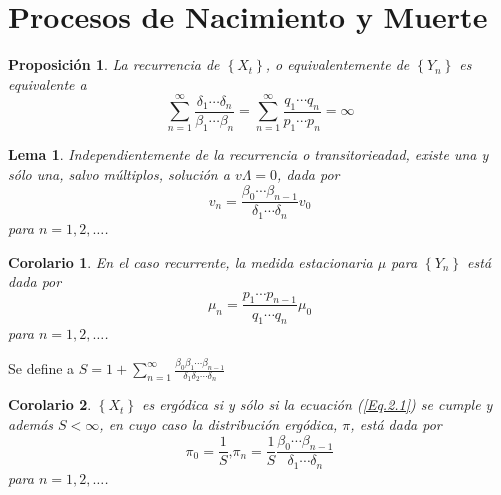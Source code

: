 \documentclass{article}
\newtheorem{Prop}{Proposición}[section]
\newtheorem{Cor}{Corolario}[section]
\newtheorem{Lema}{Lema}[section]
\numberwithin{equation}{section}
\begin{document}
%
\section{Procesos de Nacimiento y Muerte}
%

\begin{Prop}\label{Prop.2.1}
La recurrencia de $\left\{X_{t}\right\}$, o equivalentemente de
$\left\{Y_{n}\right\}$ es equivalente a
\begin{equation}\label{Eq.2.1}
\sum_{n=1}^{\infty}\frac{\delta_{1}\cdots\delta_{n}}{\beta_{1}\cdots\beta_{n}}=\sum_{n=1}^{\infty}\frac{q_{1}\cdots
q_{n}}{p_{1}\cdots p_{n}}=\infty
\end{equation}
\end{Prop}

\begin{Lema}\label{Lema.2.2}
Independientemente de la recurrencia o transitorieadad, existe una
y s\'olo una, salvo m\'ultiplos, soluci\'on a $v\Lambda=0$, dada por
\begin{equation}\label{Eq.2.2}
v_{n}=\frac{\beta_{0}\cdots\beta_{n-1}}{\delta_{1}\cdots\delta_{n}}v_{0}
\end{equation}
para $n=1,2,\ldots$.
\end{Lema}

\begin{Cor}\label{Cor.2.3}
En el caso recurrente, la medida estacionaria $\mu$ para
$\left\{Y_{n}\right\}$ est\'a dada por
\begin{equation}
\mu_{n}=\frac{p_{1}\cdots p_{n-1}}{q_{1}\cdots q_{n}}\mu_{0}
\end{equation}
para $n=1,2,\ldots$.
\end{Cor}

Se define a
$S=1+\sum_{n=1}^{\infty}\frac{\beta_{0}\beta_{1}\cdots\beta_{n-1}}{\delta_{1}\delta_{2}\cdots\delta_{n}}$

\begin{Cor}\label{Cor.2.4}
$\left\{X_{t}\right\}$ es erg\'odica si y s\'olo si la ecuaci\'on
(\ref{Eq.2.1}) se cumple y adem\'as $S<\infty$, en cuyo caso la
distribuci\'on erg\'odica, $\pi$, est\'a dada por
\begin{equation}\label{Eq.2.4}
\pi_{0}=\frac{1}{S}\textrm{,
}\pi_{n}=\frac{1}{S}\frac{\beta_{0}\cdots\beta_{n-1}}{\delta_{1}\cdots\delta_{n}}
\end{equation}
para $n=1,2,\ldots$.
\end{Cor}
\end{document}
